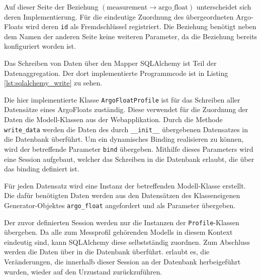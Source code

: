 
Auf dieser Seite der Beziehung   $\left( \mbox{measurement} \to \mbox{argo\_float} \right)$ unterscheidet sich deren Implementierung. Für die eindeutige Zuordnung des übergeordneten Argo-Floats wird deren \texttt{id} als Fremdschlüssel registriert. Die Beziehung benötigt neben dem Namen der anderen Seite keine weiteren Parameter, da die Beziehung bereits konfiguriert worden ist.




Das Schreiben von Daten über den Mapper SQLAlchemy ist Teil der Datenaggregation. Der dort implementierte Programmcode ist in Listing \ref{lst:sqlalchemy_write} zu sehen.




Die hier implementierte Klasse \texttt{ArgoFloatProfile} ist für das Schreiben aller Datensätze eines ArgoFloats zuständig. Diese verwendet für die Zuordnung der Daten die Modell-Klassen aus der Webapplikation. Durch die Methode \texttt{write\_data} werden die Daten des durch \texttt{\_\_init\_\_} übergebenen Datensatzes in die Datenbank überführt.
Um ein dynamisches Binding realisieren zu können, wird der betreffende Parameter \texttt{bind} übergeben. Mithilfe dieses Parameters wird eine Session aufgebaut, welcher das Schreiben in die Datenbank erlaubt, die über das binding definiert ist.

Für jeden Datensatz wird eine Instanz der betreffenden Modell-Klasse erstellt. Die dafür benötigten Daten werden aus den Datensätzen des Klasseneigenen Generator-Objektes \texttt{argo\_float} angefordert und als Parameter übergeben.

Der zuvor definierten Session werden nur die Instanzen der \texttt{Profile}-Klassen übergeben. Da alle zum Messprofil gehörenden Modells in diesem Kontext eindeutig sind, kann SQLAlchemy diese selbstständig zuordnen.
Zum Abschluss werden die Daten über  in die Datenbank überführt.
 erlaubt es, die Veränderungen, die innerhalb dieser Session an der Datenbank herbeigeführt wurden, wieder auf den Urzustand zurückzuführen.  \\

